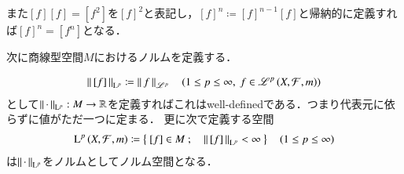 また$[f][f]=[f^2]$を$[f]^2$と表記し，$[f]^n \coloneqq [f]^{n-1}[f]$と帰納的に定義すれば$[f]^n=[f^n]$となる．

次に商線型空間$M$におけるノルムを定義する．
\begin{itembox}[l]{}
	\begin{lem}
		\begin{align}
			\left\|\, [f]\, \right\|_{\mathrm{L}^p} \coloneqq \left\|\, f\, \right\|_{\mathscr{L}^p} \quad (1 \leq p \leq \infty,\ f \in \mathscr{L}^{p} \left(X,\mathcal{F},m\right))
		\end{align}
		として$\left\|\, \cdot\, \right\|_{\mathrm{L}^p}:M \rightarrow \mathbb{R}$を定義すればこれはwell-definedである．つまり代表元に依らずに値がただ一つに定まる．
		更に次で定義する空間
		\begin{align}
			\operatorname{L}^{p} \left(X,\mathcal{F},m\right) \coloneqq \left\{\ [f] \in M\ ;\quad \left\|\, [f]\, \right\|_{\mathrm{L}^p} < \infty\ \right\} \quad (1 \leq p \leq \infty)
		\end{align}
		は$\left\|\, \cdot\, \right\|_{\mathrm{L}^p}$をノルムとしてノルム空間となる．
	\end{lem}
\end{itembox}
